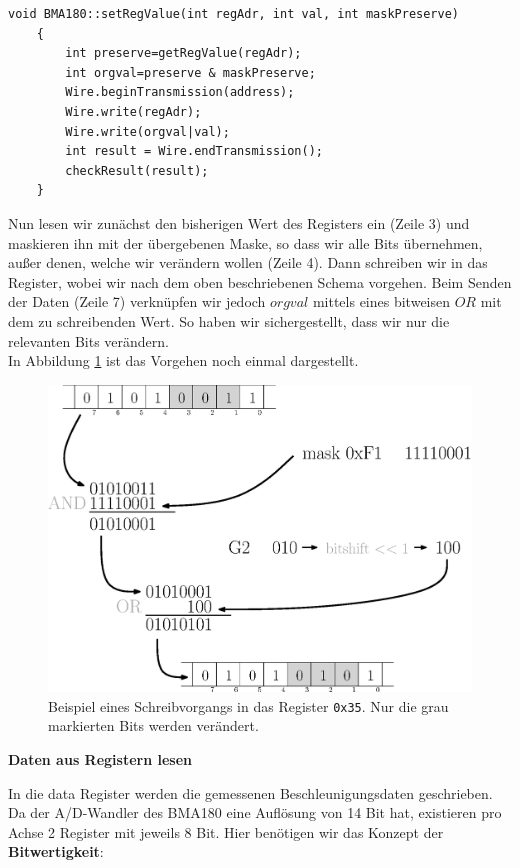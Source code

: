 \documentclass[12pt,a4paper,twoside,BCOR=12.5mm]{scrartcl}
\begin{document}
\begin{lstlisting}[frame=trBL]
	void BMA180::setRegValue(int regAdr, int val, int maskPreserve)
	{
	    int preserve=getRegValue(regAdr);	
	    int orgval=preserve & maskPreserve;
	    Wire.beginTransmission(address);
	    Wire.write(regAdr);
	    Wire.write(orgval|val);
	    int result = Wire.endTransmission();
	    checkResult(result);
	}
\end{lstlisting}

Nun lesen wir zunächst den bisherigen Wert des Registers ein (Zeile 3)  und maskieren ihn mit der übergebenen Maske, so dass wir alle Bits übernehmen, außer denen, welche wir verändern wollen (Zeile 4). Dann schreiben wir in das Register, wobei wir nach dem oben beschriebenen Schema vorgehen. Beim Senden der Daten (Zeile 7) verknüpfen wir jedoch $orgval$ mittels eines bitweisen $OR$ mit dem zu schreibenden Wert. So haben wir sichergestellt, dass wir nur die relevanten Bits verändern.\\
In Abbildung \ref{bitops} ist das Vorgehen noch einmal dargestellt.

\begin{figure}[htb]
\centering
\includegraphics[scale=.5]{bitops.eps}
\caption{Beispiel eines Schreibvorgangs in das Register \texttt{0x35}. Nur die grau markierten Bits werden verändert.}
\label{bitops}
\end{figure}

\textbf{Daten aus Registern lesen}

In die data Register werden die gemessenen Beschleunigungsdaten geschrieben. Da der A/D-Wandler des BMA180 eine Auflösung von 14 Bit hat, existieren pro Achse 2 Register mit jeweils 8 Bit. 
Hier benötigen wir das Konzept der \textbf{Bitwertigkeit}:
\end{document}
